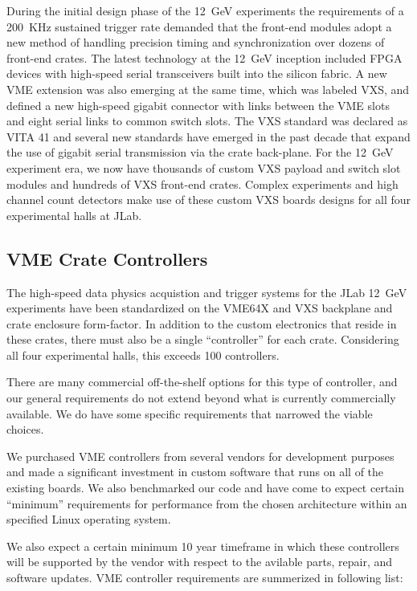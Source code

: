 During the initial design phase of the 12~GeV experiments the requirements of a 200~KHz sustained trigger rate demanded that the front-end modules adopt a new method of handling precision timing and synchronization over dozens of front-end crates. The latest technology at the 12~GeV inception included FPGA devices with high-speed serial transceivers built into the silicon fabric. A new VME extension was also emerging at the same time, which was labeled VXS, and defined a new high-speed gigabit connector with links between the VME slots and eight serial links to common switch slots. The VXS standard was declared as VITA 41 and several new standards have emerged in the past decade that expand the use of gigabit serial transmission via the crate back-plane. For the 12~GeV experiment era, we now have thousands of custom VXS payload and switch slot modules and hundreds of VXS front-end crates. Complex experiments and high channel count detectors make use of these custom VXS boards  designs for all four experimental halls at JLab.

\subsection{VME Crate Controllers}

The high-speed data physics acquistion and trigger systems for the JLab 12~GeV experiments have been standardized on the VME64X and VXS backplane and crate enclosure form-factor. In addition to the custom electronics that reside in these crates, there must also be a single ``controller'' for each crate. Considering all four experimental halls, this exceeds 100 controllers.

There are many commercial off-the-shelf options for this type of controller, and our general requirements do not extend beyond what is currently commercially available. We do have some specific requirements that narrowed the viable choices.

We purchased VME controllers from several vendors for development purposes and made a significant investment in custom software that runs on all of the existing boards. We also benchmarked our code and have come to expect certain ``minimum'' requirements for performance from the chosen architecture within an specified Linux operating system.

We also expect a certain minimum 10 year timeframe in which these controllers will be supported by the vendor with respect to the avilable parts, repair, and software updates. VME controller requirements are summerized in following list:

